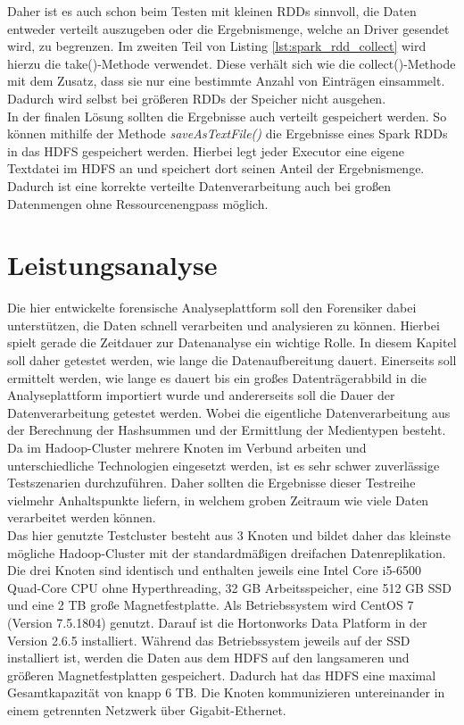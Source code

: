 \noindent
Daher ist es auch schon beim Testen mit kleinen RDDs sinnvoll, die Daten entweder verteilt auszugeben oder die Ergebnismenge, welche an Driver gesendet wird, zu begrenzen. Im zweiten Teil von Listing \ref{lst:spark_rdd_collect}  wird hierzu die take()-Methode verwendet. Diese verhält sich wie  die collect()-Methode mit dem Zusatz, dass sie nur eine bestimmte Anzahl von Einträgen einsammelt. Dadurch wird selbst bei größeren RDDs der Speicher nicht ausgehen.\\
In der finalen Lösung sollten die Ergebnisse auch verteilt gespeichert werden.  So können mithilfe der Methode \textit{saveAsTextFile()} die Ergebnisse eines Spark RDDs in das HDFS gespeichert werden. Hierbei legt jeder Executor eine eigene Textdatei im HDFS an und speichert dort seinen Anteil der Ergebnismenge. Dadurch ist eine korrekte verteilte Datenverarbeitung auch bei großen Datenmengen ohne Ressourcenengpass möglich. 


\section{Leistungsanalyse}
\label{sec:performance_analysis}
Die hier entwickelte forensische Analyseplattform soll den Forensiker dabei unterstützen, die Daten schnell verarbeiten und analysieren zu können. Hierbei spielt gerade die Zeitdauer zur Datenanalyse ein wichtige Rolle. In diesem Kapitel soll daher getestet werden, wie lange die Datenaufbereitung dauert. Einerseits soll ermittelt werden, wie lange es dauert bis ein großes Datenträgerabbild in die Analyseplattform importiert wurde und andererseits soll die Dauer der Datenverarbeitung getestet werden. Wobei die eigentliche Datenverarbeitung aus der Berechnung der Hashsummen und der Ermittlung der Medientypen besteht.\\

\noindent
Da im Hadoop-Cluster mehrere Knoten im Verbund arbeiten und unterschiedliche Technologien eingesetzt werden, ist es sehr schwer zuverlässige Testszenarien durchzuführen. Daher sollten die Ergebnisse dieser Testreihe vielmehr Anhaltspunkte liefern, in welchem groben Zeitraum wie viele Daten verarbeitet werden können.\\

\noindent
Das hier genutzte Testcluster besteht aus 3 Knoten und bildet daher das kleinste mögliche Hadoop-Cluster mit der standardmäßigen dreifachen Datenreplikation. Die drei Knoten sind identisch und enthalten jeweils eine Intel Core i5-6500 Quad-Core CPU ohne Hyperthreading, 32 GB Arbeitsspeicher, eine 512 GB SSD und eine 2 TB große Magnetfestplatte. Als Betriebssystem wird CentOS 7 (Version 7.5.1804) genutzt. Darauf ist die Hortonworks Data Platform in der Version 2.6.5 installiert. Während das Betriebssystem jeweils auf der SSD installiert ist, werden die Daten aus dem HDFS auf den langsameren und größeren Magnetfestplatten gespeichert. Dadurch hat das HDFS eine maximal Gesamtkapazität von knapp 6 TB. Die Knoten kommunizieren untereinander in einem getrennten Netzwerk über Gigabit-Ethernet.\\  

